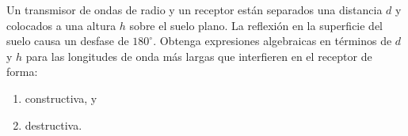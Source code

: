 \item Un transmisor de ondas de radio y un receptor están separados una distancia $d$ y colocados a una altura $h$ sobre el suelo plano. La reflexión en la superficie del suelo causa un desfase de $180^\circ$. Obtenga expresiones algebraicas en términos de $d$ y $h$ para las longitudes de onda más largas que interfieren en el receptor de forma:
\begin{enumerate}
    \item constructiva, y
    \item destructiva.
\end{enumerate}